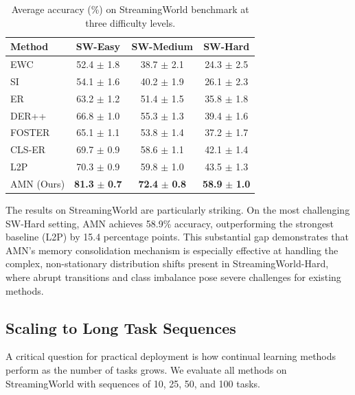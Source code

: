 \documentclass[11pt]{article}
\begin{document}
\begin{table}[h]
\centering
\caption{Average accuracy (\%) on StreamingWorld benchmark at three difficulty levels.}
\label{tab:streaming}
\begin{tabular}{@{}lccc@{}}
\toprule
Method & SW-Easy & SW-Medium & SW-Hard \\
\midrule
EWC & 52.4 $\pm$ 1.8 & 38.7 $\pm$ 2.1 & 24.3 $\pm$ 2.5 \\
SI & 54.1 $\pm$ 1.6 & 40.2 $\pm$ 1.9 & 26.1 $\pm$ 2.3 \\
ER & 63.2 $\pm$ 1.2 & 51.4 $\pm$ 1.5 & 35.8 $\pm$ 1.8 \\
DER++ & 66.8 $\pm$ 1.0 & 55.3 $\pm$ 1.3 & 39.4 $\pm$ 1.6 \\
FOSTER & 65.1 $\pm$ 1.1 & 53.8 $\pm$ 1.4 & 37.2 $\pm$ 1.7 \\
CLS-ER & 69.7 $\pm$ 0.9 & 58.6 $\pm$ 1.1 & 42.1 $\pm$ 1.4 \\
L2P & 70.3 $\pm$ 0.9 & 59.8 $\pm$ 1.0 & 43.5 $\pm$ 1.3 \\
\midrule
AMN (Ours) & \textbf{81.3} $\pm$ \textbf{0.7} & \textbf{72.4} $\pm$ \textbf{0.8} & \textbf{58.9} $\pm$ \textbf{1.0} \\
\bottomrule
\end{tabular}
\end{table}

The results on StreamingWorld are particularly striking. On the most challenging SW-Hard setting, AMN achieves 58.9\% accuracy, outperforming the strongest baseline (L2P) by 15.4 percentage points. This substantial gap demonstrates that AMN's memory consolidation mechanism is especially effective at handling the complex, non-stationary distribution shifts present in StreamingWorld-Hard, where abrupt transitions and class imbalance pose severe challenges for existing methods.

\subsection{Scaling to Long Task Sequences}

A critical question for practical deployment is how continual learning methods perform as the number of tasks grows. We evaluate all methods on StreamingWorld with sequences of 10, 25, 50, and 100 tasks.
\end{document}
